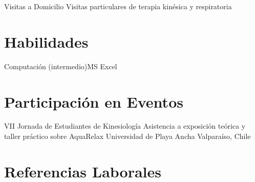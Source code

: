 \documentclass[11pt,a4paper,sans]{moderncv}
\begin{document}
\cventry{}
        {Visitas a Domicilio}
        {Visitas particulares de terapia kinésica y respiratoria}
        {}
        {}
        {}
        
\section{Habilidades}
           {Computación (intermedio)}{MS Excel}

\section{Participación en Eventos}

        {VII Jornada de Estudiantes de Kinesiología}
        {Asistencia a exposición teórica y taller práctico sobre AquaRelax}
        {Universidad de Playa Ancha}
        {Valparaíso, Chile}
        {}
        
\section{Referencias Laborales}

\end{document}
